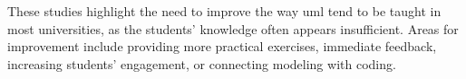 These studies highlight the need to improve the way \ac{uml} tend to be taught in most universities, as the students' knowledge often appears insufficient. Areas for improvement include providing more practical exercises, immediate feedback, increasing students' engagement, or connecting modeling with coding.

